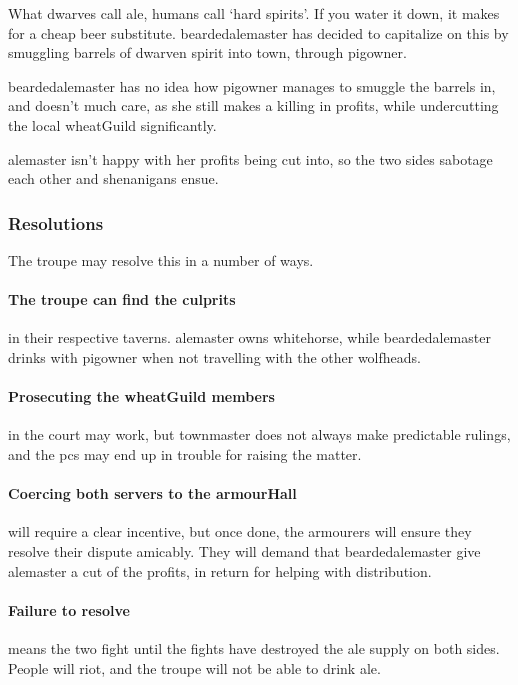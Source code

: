 
\label{troubleAle}

\noindent
What dwarves call ale, humans call `hard spirits'.
If you water it down, it makes for a cheap beer substitute.
\Gls{beardedalemaster} has decided to capitalize on this by smuggling barrels of dwarven spirit into \gls{town}, through \gls{pigowner}.

\Gls{beardedalemaster} has no idea how \gls{pigowner} manages to smuggle the barrels in, and doesn't much care, as she still makes a killing in profits, while undercutting the local \gls{wheatGuild} significantly.

\Gls{alemaster} isn't happy with her profits being cut into, so the two sides sabotage each other and shenanigans ensue.

\subsubsection*{Resolutions}

The troupe may resolve this in a number of ways.

\paragraph{The troupe can find the culprits}
in their respective taverns.
\Gls{alemaster} owns \gls{whitehorse}, while \gls{beardedalemaster} drinks with \gls{pigowner} when not travelling with the other \glspl{wolfhead}.

\paragraph{Prosecuting the \gls{wheatGuild} members}
in the \gls{court} may work, but \gls{townmaster} does not always make predictable rulings, and the \glspl{pc} may end up in trouble for raising the matter.%

\paragraph{Coercing both \glspl{server} to the \gls{armourHall}}
will require a clear incentive, but once done, the \glspl{armourer} will ensure they resolve their dispute amicably.
They will demand that \gls{beardedalemaster} give \gls{alemaster} a cut of the profits, in return for helping with distribution.
\label{aleResolution}

\paragraph{Failure to resolve}
means the two fight until the fights have destroyed the ale supply on both sides.
People will riot, and the troupe will not be able to drink ale.

